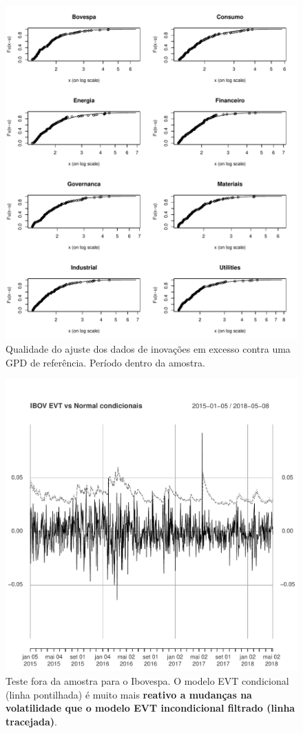 \documentclass{article}
\begin{document}
	\begin{figure}[H]
		\centering
		\includegraphics[width=1\linewidth]{figs/artigo-gpdfit}
		\caption{Qualidade do ajuste dos dados de inovações em excesso contra uma GPD de referência. Período dentro da amostra.}
		\label{fig:artigo-gpdfit}
	\end{figure}

	\begin{figure}[H]
		\centering
		\includegraphics[width=1\linewidth]{figs/artigo-ibovevt}
		\caption{Teste fora da amostra para o Ibovespa. O modelo EVT condicional (linha pontilhada) é muito mais \textbf{reativo a mudanças na volatilidade que o modelo EVT incondicional filtrado (linha tracejada)}.}
		\label{fig:artigo-sp500evt}
	\end{figure}
\end{document}
